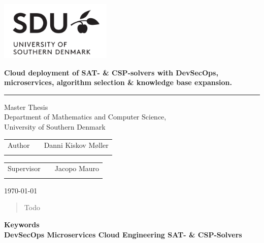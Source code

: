 \documentclass[12pt]{article}
\begin{document}

\begin{titlepage}
\Large
\includegraphics[width=0.4\textwidth]{logo.png}
\renewcommand{\thepage}{Title}
\thispagestyle{empty}
   \begin{center}
       \vspace*{1cm}
\linespread{1.25}
       {\doublespacing \Huge\textbf{Cloud deployment of SAT- \& CSP-solvers with DevSecOps, microservices, algorithm selection \& knowledge base expansion.}}
\linespread{1}
       \rule{\linewidth}{1pt}
       {\huge Master Thesis \\
       \Large Department of Mathematics and Computer Science, \\
       University of Southern Denmark}
\end{center}
\vspace{5cm}
\Large
\begin{tabularx}{\textwidth}{lXr}
Author & & Danni Kiskov Møller \\ \\
\end{tabularx}
\begin{tabularx}{\textwidth}{lXr}
Supervisor & & Jacopo Mauro\\ \\
\end{tabularx}

\vfill
\large \today
\end{titlepage}

\thispagestyle{empty}



\thispagestyle{empty}
\tableofcontents
\thispagestyle{empty}
\newpage
{}

\renewcommand{\abstractname}{Abstract}
\begin{abstract}
Todo
\end{abstract}

\begin{center} \bf Keywords \\  DevSecOps  \quad Microservices \quad Cloud Engineering \quad SAT- \& CSP-Solvers  \end{center}
\end{document}
